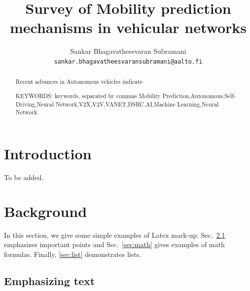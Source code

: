 \documentclass[article]{aaltoseries}
\begin{document}
 

\title{Survey of Mobility prediction mechanisms in vehicular networks}

\author{Sankar Bhagavatheesvaran Subramani%
\\\textnormal{\texttt{sankar.bhagavatheesvaransubramani@aalto.fi}}} %


\maketitle


\begin{abstract}
  Recent advances in Autonomous vehicles indicate 

\vspace{3mm}
\noindent KEYWORDS: keywords, separated by commas
Mobility Prediction,Autonomous,Self-Driving,Neural Network,V2X,V2V,VANET,DSRC,AI,Machine Learning,Neural Network
\end{abstract}




\section{Introduction}

To be added.




\section{Background}

In this section, we give some simple examples of Latex mark-up.
Sec.~\ref{sec:emphasis} emphasizes important points and
Sec.~\ref{sec:math} gives examples of math formulas.
Finally, \ref{sec:list} demonstrates lists.




\subsection{Emphasizing text}
\label{sec:emphasis}
\end{document}

